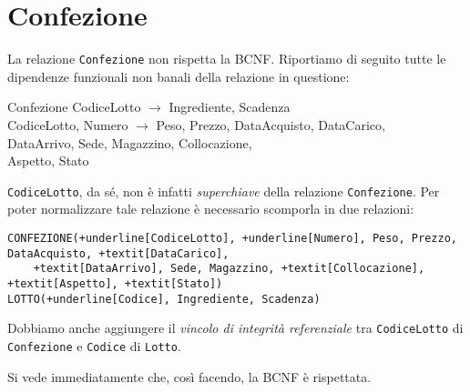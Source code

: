 \section{Confezione}\label{sec:confezione}
La relazione {\tt Confezione} non rispetta la BCNF. Riportiamo di seguito tutte
le dipendenze funzionali non banali della relazione in questione:
\begin{funcdep}{Confezione}
    CodiceLotto $\to$ Ingrediente, Scadenza\\
    CodiceLotto, Numero $\to$ Peso, Prezzo, DataAcquisto, DataCarico,\\
        \indent\indent\indent\indent\indent DataArrivo, Sede, Magazzino, Collocazione,\\
        \indent\indent\indent\indent\indent Aspetto, Stato
\end{funcdep}

\noindent\texttt{CodiceLotto}, da sé, non è infatti {\it superchiave} della relazione {\tt Confezione}.
Per poter normalizzare tale relazione è necessario scomporla in due relazioni:

\begin{Verbatim}[commandchars=+\[\]]
CONFEZIONE(+underline[CodiceLotto], +underline[Numero], Peso, Prezzo, DataAcquisto, +textit[DataCarico],
    +textit[DataArrivo], Sede, Magazzino, +textit[Collocazione], +textit[Aspetto], +textit[Stato])
LOTTO(+underline[Codice], Ingrediente, Scadenza)
\end{Verbatim}
Dobbiamo anche aggiungere il {\it vincolo di integrità referenziale} tra {\tt CodiceLotto}
di {\tt Confezione} e {\tt Codice} di {\tt Lotto}.

\vspace{10pt}
\noindent Si vede immediatamente che, così facendo, la BCNF è rispettata.
